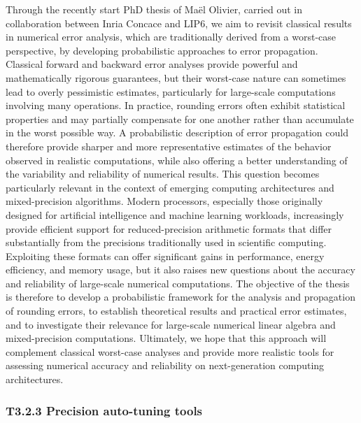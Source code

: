 Through the recently start PhD thesis of Maël Olivier, carried out  in collaboration between Inria Concace and LIP6, we aim to revisit classical results in numerical error analysis, which are traditionally derived from a worst-case perspective, by developing probabilistic approaches to error propagation.
Classical forward and backward error analyses provide powerful and mathematically rigorous guarantees, but their worst-case nature can sometimes lead to overly pessimistic estimates, particularly for large-scale computations involving many operations. In practice, rounding errors often exhibit statistical properties and may partially compensate for one another rather than accumulate in the worst possible way. A probabilistic description of error propagation could therefore provide sharper and more representative estimates of the behavior observed in realistic computations, while also offering a better understanding of the variability and reliability of numerical results.
This question becomes particularly relevant in the context of emerging computing architectures and mixed-precision algorithms. Modern processors, especially those originally designed for artificial intelligence and machine learning workloads, increasingly provide efficient support for reduced-precision arithmetic formats that differ substantially from the precisions traditionally used in scientific computing. Exploiting these formats can offer significant gains in performance, energy efficiency, and memory usage, but it also raises new questions about the accuracy and reliability of large-scale numerical computations.
The objective of the thesis is therefore to develop a probabilistic framework for the analysis and propagation of rounding errors, to establish theoretical results and practical error estimates, and to investigate their relevance for large-scale numerical linear algebra and mixed-precision computations. Ultimately, we hope that this approach will complement classical worst-case analyses and provide more realistic tools for assessing numerical accuracy and reliability on next-generation computing architectures.

\subsubsection{ 
T3.2.3 Precision auto-tuning tools
} 


